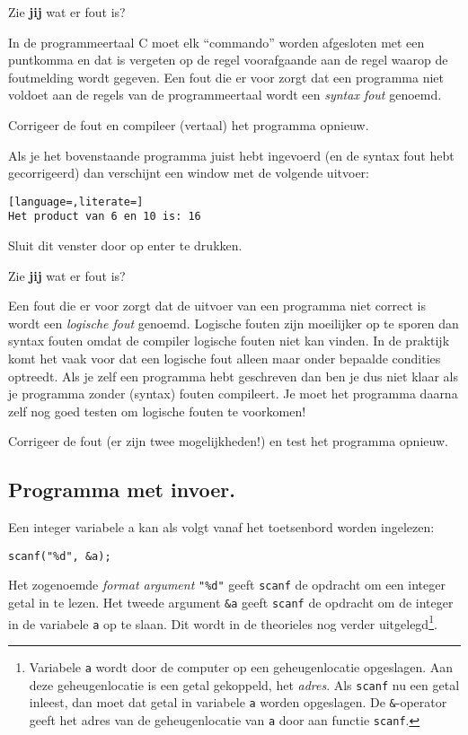 \documentclass[a4paper,10pt,fleqn,twoside]{article}
\begin{document}
Zie \textbf{jij} wat er fout is?

In de programmeertaal C moet elk ``commando'' worden afgesloten met een puntkomma en dat is vergeten op de regel voorafgaande aan de regel waarop de foutmelding wordt gegeven. Een fout die er voor zorgt dat een programma niet voldoet aan de regels van de programmeertaal wordt een \textsl{syntax fout} genoemd.

Corrigeer de fout en compileer (vertaal) het programma opnieuw.

Als je het bovenstaande programma juist hebt ingevoerd (en de syntax fout hebt gecorrigeerd) dan verschijnt een window met de volgende uitvoer:

\begin{lstlisting}[language=,literate=]
Het product van 6 en 10 is: 16
\end{lstlisting}

Sluit dit venster door op enter te drukken.

Zie \textbf{jij} wat er fout is?

Een fout die er voor zorgt dat de uitvoer van een programma niet correct is wordt een \textsl{logische fout} genoemd. Logische fouten zijn moeilijker op te sporen dan syntax fouten omdat de compiler logische fouten niet kan vinden. In de praktijk komt het vaak voor dat een logische fout alleen maar onder bepaalde condities optreedt. Als je zelf een programma hebt geschreven dan ben je dus niet klaar als je programma zonder (syntax) fouten compileert. Je moet het programma daarna zelf nog goed testen om logische fouten te voorkomen! 

Corrigeer de fout (er zijn twee mogelijkheden!) en test het programma opnieuw.

\subsection{Programma met invoer.}
Een integer variabele a kan als volgt vanaf het toetsenbord worden ingelezen:

\begin{lstlisting}
scanf("%d", &a);
\end{lstlisting}

Het  zogenoemde \textsl{format argument} \lstinline|"%d"| geeft \lstinline|scanf| de opdracht om een integer getal in te lezen. Het tweede argument \lstinline|&a| geeft \lstinline|scanf| de opdracht om de integer in de variabele \lstinline|a| op te slaan. Dit wordt in de theorieles nog verder uitgelegd\footnote{Variabele \lstinline|a| wordt door de computer op een geheugenlocatie opgeslagen. Aan deze geheugenlocatie is een getal gekoppeld, het \textsl{adres}. Als \lstinline|scanf| nu een getal inleest, dan moet dat getal in variabele \lstinline|a| worden opgeslagen. De \lstinline|&|-operator geeft het adres van de geheugenlocatie van \lstinline|a| door aan functie \lstinline|scanf|.}.
\end{document}

